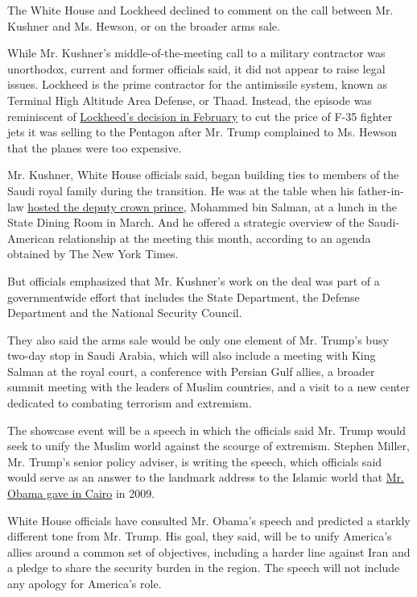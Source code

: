 The White House and Lockheed declined to comment on the call between Mr.
Kushner and Ms. Hewson, or on the broader arms sale.

While Mr. Kushner's middle-of-the-meeting call to a military contractor
was unorthodox, current and former officials said, it did not appear to
raise legal issues. Lockheed is the prime contractor for the antimissile
system, known as Terminal High Altitude Area Defense, or Thaad. Instead,
the episode was reminiscent of
\href{https://www.nytimes3xbfgragh.onion/2017/02/03/business/lockheed-lowers-price-on-f-35-fighters-after-prodding-by-trump.html}{Lockheed's
decision in February} to cut the price of F-35 fighter jets it was
selling to the Pentagon after Mr. Trump complained to Ms. Hewson that
the planes were too expensive.

Mr. Kushner, White House officials said, began building ties to members
of the Saudi royal family during the transition. He was at the table
when his father-in-law
\href{https://www.nytimes3xbfgragh.onion/2017/03/14/world/middleeast/mohammed-bin-salman-saudi-arabia-trump.html}{hosted
the deputy crown prince}, Mohammed bin Salman, at a lunch in the State
Dining Room in March. And he offered a strategic overview of the
Saudi-American relationship at the meeting this month, according to an
agenda obtained by The New York Times.

But officials emphasized that Mr. Kushner's work on the deal was part of
a governmentwide effort that includes the State Department, the Defense
Department and the National Security Council.

They also said the arms sale would be only one element of Mr. Trump's
busy two-day stop in Saudi Arabia, which will also include a meeting
with King Salman at the royal court, a conference with Persian Gulf
allies, a broader summit meeting with the leaders of Muslim countries,
and a visit to a new center dedicated to combating terrorism and
extremism.

The showcase event will be a speech in which the officials said Mr.
Trump would seek to unify the Muslim world against the scourge of
extremism. Stephen Miller, Mr. Trump's senior policy adviser, is writing
the speech, which officials said would serve as an answer to the
landmark address to the Islamic world that
\href{http://www.nytimes3xbfgragh.onion/2009/06/05/world/middleeast/05prexy.html}{Mr.
Obama gave in Cairo} in 2009.

White House officials have consulted Mr. Obama's speech and predicted a
starkly different tone from Mr. Trump. His goal, they said, will be to
unify America's allies around a common set of objectives, including a
harder line against Iran and a pledge to share the security burden in
the region. The speech will not include any apology for America's role.

